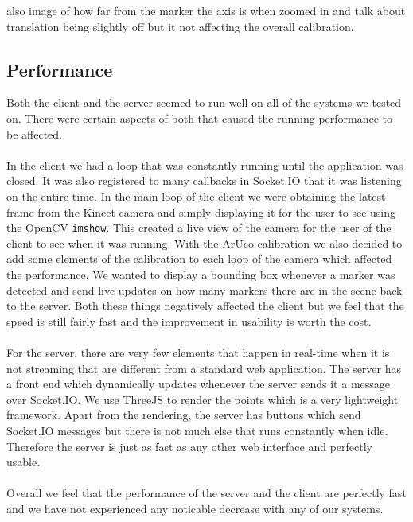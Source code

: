 \documentclass{article}
\begin{document}
also image of how far from the marker the axis is when zoomed in and talk about translation being slightly off but it not affecting the overall calibration.

\subsection{Performance}
Both the client and the server seemed to run well on all of the systems we tested on. There were certain aspects of both that caused the running performance to be affected.
\\\\
In the client we had a loop that was constantly running until the application was closed. It was also registered to many callbacks in Socket.IO that it was listening on the entire time. In the main loop of the client we were obtaining the latest frame from the Kinect camera and simply displaying it for the user to see using the OpenCV \texttt{imshow}. This created a live view of the camera for the user of the client to see when it was running. With the ArUco calibration we also decided to add some elements of the calibration to each loop of the camera which affected the performance. We wanted to display a bounding box whenever a marker was detected and send live updates on how many markers there are in the scene back to the server. Both these things negatively affected the client but we feel that the speed is still fairly fast and the improvement in usability is worth the cost.
\\\\
For the server, there are very few elements that happen in real-time when it is not streaming that are different from a standard web application. The server has a front end which dynamically updates whenever the server sends it a message over Socket.IO. We use ThreeJS to render the points which is a very lightweight framework. Apart from the rendering, the server has buttons which send Socket.IO messages but there is not much else that runs constantly when idle. Therefore the server is just as fast as any other web interface and perfectly usable.
\\\\
Overall we feel that the performance of the server and the client are perfectly fast and we have not experienced any noticable decrease with any of our systems.
\end{document}
